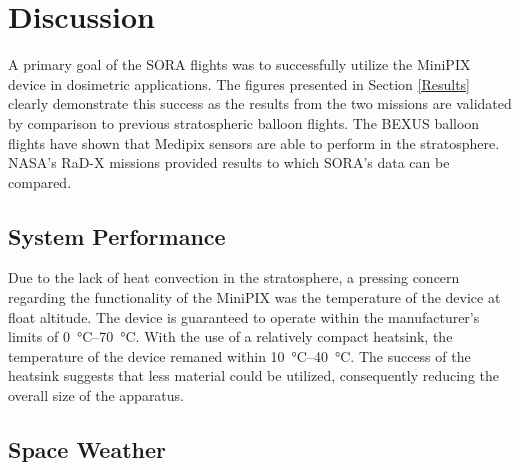 
\section{Discussion}

\label{Discussion}

A primary goal of the SORA flights was to successfully utilize the MiniPIX device in dosimetric applications. The figures presented in Section \ref{Results} clearly demonstrate this success as the results from the two missions are validated by comparison to previous stratospheric balloon flights. The BEXUS \cite{bexus} balloon flights have shown that Medipix sensors are able to perform in the stratosphere. NASA's RaD-X missions \cite{rad-x} provided results to which SORA's data can be compared.

\subsection{System Performance}



Due to the lack of heat convection in the stratosphere, a pressing concern regarding the functionality of the MiniPIX was the temperature of the device at float altitude. The device is guaranteed to operate within the manufacturer's limits of \SIrange{0}{70}{\celsius}. With the use of a relatively compact heatsink, the temperature of the device remaned within \SIrange{10}{40}{\celsius}. The success of the heatsink suggests that less material could be utilized, consequently reducing the overall size of the apparatus.

\subsection{Space Weather}


